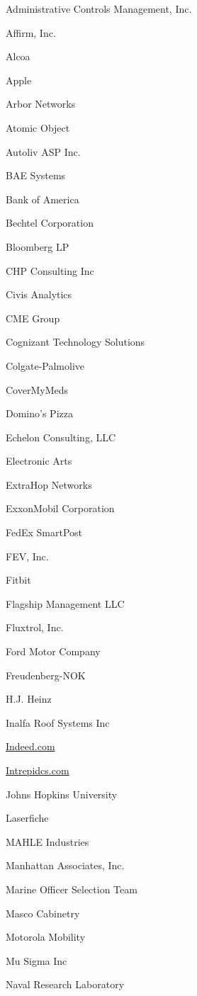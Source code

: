 \documentclass[twoside]{article}
\begin{document}
\begin{center}
\begin{multicols}{5}
\begin{FlushLeft}
\begin{compactitem}
\item Administrative Controls Management, Inc.
\item Affirm, Inc.
\item Alcoa
\item Apple
\item Arbor Networks
\item Atomic Object
\item Autoliv ASP Inc.
\item BAE Systems
\item Bank of America
\item Bechtel Corporation
\item Bloomberg LP
\item CHP Consulting Inc
\item Civis Analytics
\item CME Group
\item Cognizant Technology Solutions
\item Colgate-Palmolive
\item CoverMyMeds
\item Domino's Pizza
\item Echelon Consulting, LLC
\item Electronic Arts
\item ExtraHop Networks
\item ExxonMobil Corporation
\item FedEx SmartPost
\item FEV, Inc.
\item Fitbit
\item Flagship Management LLC
\item Fluxtrol, Inc.
\item Ford Motor Company
\item Freudenberg-NOK
\item H.J. Heinz
\item Inalfa Roof Systems Inc
\item \url{Indeed.com}
\item \url{Intrepidcs.com}
\item Johns Hopkins University
\item Laserfiche
\item MAHLE Industries
\item Manhattan Associates, Inc.
\item Marine Officer Selection Team
\item Masco Cabinetry
\item Motorola Mobility
\item Mu Sigma Inc
\item Naval Research Laboratory

\end{compactitem}
\end{FlushLeft}
\end{multicols}
\end{center}
\end{document}
